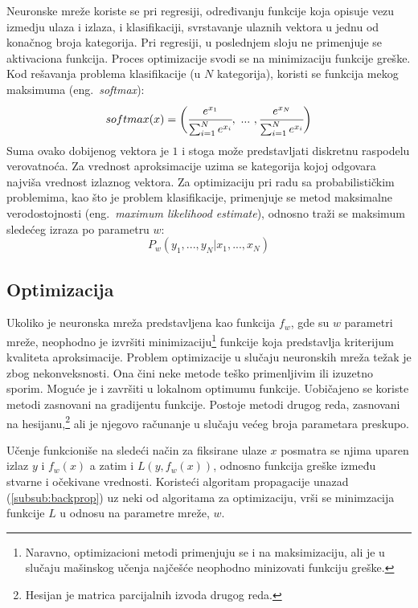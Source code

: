 Neuronske mreže koriste se pri regresiji, određivanju funkcije koja opisuje vezu izmedju ulaza i izlaza, i klasifikaciji, svrstavanje ulaznih vektora u jednu od konačnog broja kategorija. Pri regresiji, u poslednjem sloju ne primenjuje se aktivaciona funkcija. Proces optimizacije svodi se na minimizaciju funkcije greške. Kod rešavanja problema klasifikacije (u $N$ kategorija), koristi se funkcija mekog maksimuma (eng.~{\em softmax}):
\begin{equation}
	softmax(x) = \bigg( \cfrac{e^{x_1}}{\sum_{i=1}^{N} e^{x_i}}, ~...~, \cfrac{e^{x_N}}{\sum_{i=1}^{N} e^{x_i}} \bigg)
\end{equation}
Suma ovako dobijenog vektora je $1$ i stoga može predstavljati diskretnu raspodelu verovatnoća. Za vrednost aproksimacije uzima se kategorija kojoj odgovara najviša vrednost izlaznog vektora. Za optimizaciju pri radu sa probabilističkim problemima, kao što je problem klasifikacije, primenjuje se metod maksimalne verodostojnosti (eng.~{\em maximum likelihood estimate}), odnosno traži se maksimum sledećeg izraza po parametru $w$: 
\begin{equation}
	P_w(y_1, ..., y_N | x_1, ..., x_N)
\end{equation}

\subsection{Optimizacija}
\label{subsec:optimizacija}

Ukoliko je neuronska mreža predstavljena kao funkcija $f_w$, gde su $w$ parametri mreže, neophodno je izvršiti minimizaciju\footnote{Naravno, optimizacioni metodi primenjuju se i na maksimizaciju, ali je u slučaju mašinskog učenja najčešće neophodno minizovati funkciju greške.} funkcije koja predstavlja kriterijum kvaliteta aproksimacije. Problem optimizacije u slučaju neuronskih mreža težak je zbog nekonveksnosti. Ona čini neke metode teško primenljivim ili izuzetno sporim. Moguće je i završiti u lokalnom optimumu funkcije. Uobičajeno se koriste metodi zasnovani na gradijentu funkcije. Postoje metodi drugog reda, zasnovani na hesijanu,\footnote{Hesijan je matrica parcijalnih izvoda drugog reda.} ali je njegovo računanje u slučaju većeg broja parametara preskupo. \par
Učenje funkcioniše na sledeći način za fiksirane ulaze $x$ posmatra se njima uparen izlaz $y$ i $f_w(x)$ a zatim i $L(y, f_w(x))$, odnosno funkcija greške između stvarne i očekivane vrednosti. Koristeći algoritam propagacije unazad (\ref{subsub:backprop}) uz neki od algoritama za optimizaciju, vrši se minimzacija funkcije $L$ u odnosu na parametre mreže, $w$. 

